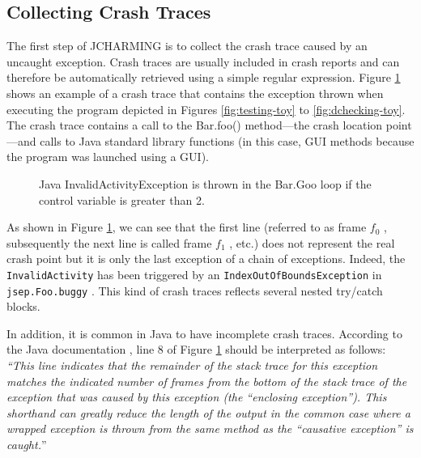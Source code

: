 \documentclass[times]{smrauth}
\begin{document}
\subsection{Collecting Crash Traces}

The first step of JCHARMING is to collect the crash trace
caused by an uncaught exception. Crash traces are usually included in crash reports and can therefore be automatically
retrieved using a simple regular expression.
Figure \ref{fig:jcarming-traces} shows an example of a crash trace that contains the
exception thrown when executing the program depicted in
Figures \ref{fig:testing-toy} to \ref{fig:dchecking-toy}. The crash trace contains a call to the Bar.foo()
method—the crash location point—and calls to Java standard
library functions (in this case, GUI methods because the
program was launched using a GUI).

\begin{figure}[h!]
  \noindent{}
    \caption{Java InvalidActivityException is thrown in the Bar.Goo loop if the control variable is greater than 2.
    \label{fig:jcarming-traces}}
\end{figure}

As shown in Figure \ref{fig:jcarming-traces}, we can see that the first line (referred to
as frame {\it $f_0$} , subsequently the next line is called frame {\it $f_1$} , etc.)
does not represent the real crash point but it is only the last
exception of a chain of exceptions. Indeed, the {\tt InvalidActivity}
has been triggered by an {\tt IndexOutOfBoundsException} in
{\tt jsep.Foo.buggy} . This kind of crash traces reflects several
nested try/catch blocks.

In addition, it is common in Java to have incomplete crash
traces. According to the Java documentation \cite{Oracle2011}, line 8 of
Figure \ref{fig:jcarming-traces} should be interpreted as follows: {\it ``This line indicates
that the remainder of the stack trace for this exception
matches the indicated number of frames from the bottom of the
stack trace of the exception that was caused by this exception
(the ``enclosing exception''). This shorthand can greatly
reduce the length of the output in the common case where a
wrapped exception is thrown from the same method as the
``causative exception'' is caught.}''
\end{document}
